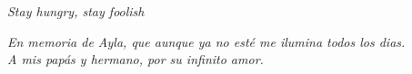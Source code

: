 \newpage \vspace*{8cm}
\thispagestyle{empty}

\begin{flushright}
   \emph{Stay hungry, stay foolish}\\
\end{flushright}



\cleardoublepage \vspace*{8cm}
\thispagestyle{empty}

\begin{flushright}
   \emph{En memoria de Ayla, que aunque ya no esté me ilumina todos los dias.}\\
   \emph{A mis papás y hermano, por su infinito amor.}
\end{flushright}
